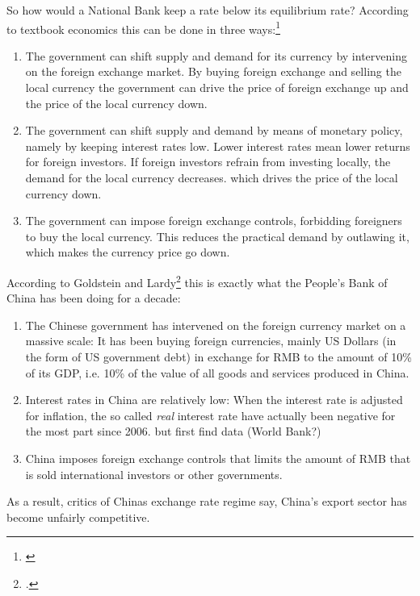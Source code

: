 So how would a National Bank keep a rate below its equilibrium rate? According to 
textbook economics this can be done in three ways:\footnote{\cite[pp. 
514]{Krugman2008}}

\begin{enumerate}
\item{The government can shift supply and demand for its currency by 
	intervening on the foreign exchange market. By buying foreign 
exchange and selling the local currency the government can drive the 
price of foreign exchange up and the price of the local currency down.}
\item{The government can shift supply and demand by means of monetary 
	policy, namely by keeping interest rates low. Lower interest rates 
mean lower returns for foreign investors. If foreign investors refrain 
from investing locally, the demand for the local currency decreases.  
which drives the price of the local currency down.}
\item{The government can impose foreign exchange controls, forbidding 
	foreigners to buy the local currency. This reduces the practical 
demand by outlawing it, which makes the currency price go down.}
\end{enumerate}

According to Goldstein and Lardy\footnote{\cite[pp.  
40]{Goldstein2008}.} this is exactly what the People's Bank of 
China has been doing for a decade:

\begin{enumerate}
\item{The Chinese government has intervened on the foreign currency 
		market on a massive scale: It has been buying foreign 
		currencies, mainly US Dollars (in the form of US government 
		debt) in exchange for RMB to the amount of 10\% of its GDP, i.e. 
		10\% of the value of all goods and services produced in China.} 
\item{Interest rates in China are relatively low: When the interest rate 
	is adjusted for inflation, the so called \emph{real} interest rate 
have actually been negative for the most part since 2006.} %
but first find data (World Bank?)
\item{China imposes foreign exchange controls that limits the amount of RMB that is sold international investors or other governments.}
\end{enumerate}

As a result, critics of Chinas exchange rate regime say, China's export 
sector has become unfairly competitive. 

